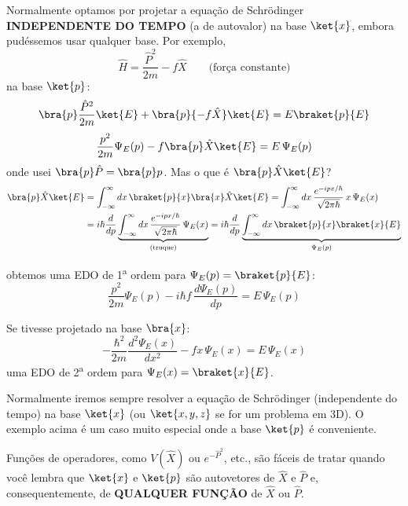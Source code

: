 Normalmente optamos por projetar a equação de Schrödinger \textbf{INDEPENDENTE DO TEMPO} (a de autovalor) na base $\ket{x}$, embora pudéssemos usar qualquer base. Por exemplo,
\begin{equation}
    \hat{H} = \frac{\hat{P}^2}{2m} - f\hat{X} \qquad \text{(força constante)}
\label{eq:aula13_H_forca_constante}
\end{equation}
na base $\ket{p}$:
\begin{equation}
    \bra{p}\frac{\hat{P}^2}{2m}\ket{E} + \bra{p}{-f\hat{X}}\ket{E} = E\braket{p}{E}
\label{eq:aula13_proj_base_p}
\end{equation}
\begin{equation}
    \frac{p^2}{2m}\Psi_E(p) - f\bra{p}\hat{X}\ket{E} = E\,\Psi_E(p)
\label{eq:aula13_proj_base_p_2}
\end{equation}
onde usei $\bra{p}\hat{P} = \bra{p}p$. Mas o que é $\bra{p}\hat{X}\ket{E}$?
\begin{align}
    \bra{p}\hat{X}\ket{E} &= \int_{-\infty}^{\infty} dx \, \braket{p}{x}\bra{x}\hat{X}\ket{E} = \int_{-\infty}^{\infty} dx \, \frac{e^{-ipx/\hbar}}{\sqrt{2\pi\hbar}}\, x\,\Psi_E(x) \notag \\
    &= i\hbar \frac{d}{dp}\underbrace{\int_{-\infty}^{\infty} dx \, \frac{e^{-ipx/\hbar}}{\sqrt{2\pi\hbar}}\,\Psi_E(x)}_{\text{(truque)}} = i\hbar\frac{d}{dp}\underbrace{\int_{-\infty}^{\infty} dx \, \braket{p}{x}\braket{x}{E}}_{\Psi_E(p)}
\label{eq:aula13_bra_p_X_ket_E}
\end{align}

obtemos uma EDO de 1\textsuperscript{a} ordem para $\Psi_E(p) = \braket{p}{E}$:
\begin{equation}
    \frac{p^2}{2m}\Psi_E(p) - i\hbar f\,\frac{d\Psi_E(p)}{dp} = E\,\Psi_E(p)
\label{eq:aula13_EDO_1ordem_p}
\end{equation}

Se tivesse projetado na base $\bra{x}$:
\begin{equation}
    -\frac{\hbar^2}{2m}\frac{d^2\Psi_E(x)}{dx^2} - fx\,\Psi_E(x) = E\,\Psi_E(x)
\label{eq:aula13_EDO_2ordem_x}
\end{equation}
uma EDO de 2\textsuperscript{a} ordem para $\Psi_E(x) = \braket{x}{E}$.

Normalmente iremos sempre resolver a equação de Schrödinger (independente do tempo) na base $\ket{x}$ (ou $\ket{x,y,z}$ se for um problema em 3D). O exemplo acima é um caso muito especial onde a base $\ket{p}$ é conveniente.

Funções de operadores, como $V(\hat{X})$ ou $e^{-\hat{P}^2}$, etc., são fáceis de tratar quando você lembra que $\ket{x}$ e $\ket{p}$ são autovetores de $\hat{X}$ e $\hat{P}$ e, consequentemente, de \textbf{QUALQUER FUNÇÃO} de $\hat{X}$ ou $\hat{P}$.

